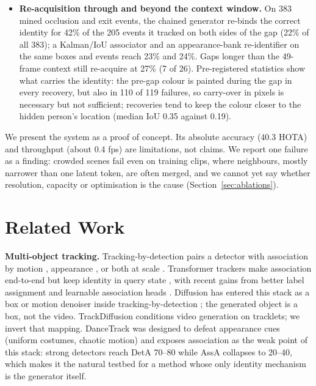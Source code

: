 \documentclass{article} %
\newcommand{\rev}[1]{#1}
\begin{document}
\begin{itemize}
\item \textbf{Re-acquisition through and beyond the context window.} On 383 mined
occlusion and exit events, the chained generator re-binds the correct identity for 42\% of
the 205 events it tracked on both sides of the gap (22\% of all 383); a Kalman/IoU
associator and an appearance-bank re-identifier on the same boxes and events reach 23\%
and 24\%. Gaps longer than the 49-frame context still re-acquire at 27\% (7 of 26).
\rev{Pre-registered statistics show what carries the identity: the pre-gap colour is painted
during the gap in every recovery, but also in 110 of 119 failures, so carry-over in pixels
is necessary but not sufficient; recoveries tend to keep the colour closer to the hidden
person's location (median IoU 0.35 against 0.19).}
\end{itemize}

\rev{We present the system as a proof of concept. Its absolute accuracy (40.3 HOTA) and
throughput (about 0.4 fps) are limitations, not claims. We report one failure as a
finding: crowded scenes fail even on training clips, where neighbours, mostly narrower than
one latent token, are often merged, and we cannot yet say whether resolution, capacity or
optimisation is the cause (Section~\ref{sec:ablations}).}

\section{Related Work}

\textbf{Multi-object tracking.} Tracking-by-detection pairs a detector with association by
motion \citep{bewley2016sort}, appearance \citep{wojke2017deepsort}, or both at scale
\citep{zhang2022bytetrack,zhang2021fairmot,zhou2020centertrack}. Transformer trackers make
association end-to-end but keep identity in query state
\citep{zeng2022motr,sun2020transtrack,gao2025motip,segu2025samba,shao2026fdta}\rev{, with
recent gains from better label assignment \citep{yan2025comot,yu2023motrv3} and learnable
association heads \citep{wang2025lamotr}}. Diffusion
has entered this stack as a box or motion denoiser inside tracking-by-detection
\citep{luo2024diffusiontrack,lv2024diffmot}; the generated object is a box, not the video.
TrackDiffusion \citep{li2025trackdiffusion} conditions video generation on tracklets; we
invert that mapping. DanceTrack \citep{sun2022dancetrack} was designed to defeat appearance
cues (uniform costumes, chaotic motion) and exposes association as the weak point of this
stack: strong detectors reach DetA 70--80 while AssA collapses to 20--40, which makes it
the natural testbed for a method whose only identity mechanism is the generator itself.
\end{document}
